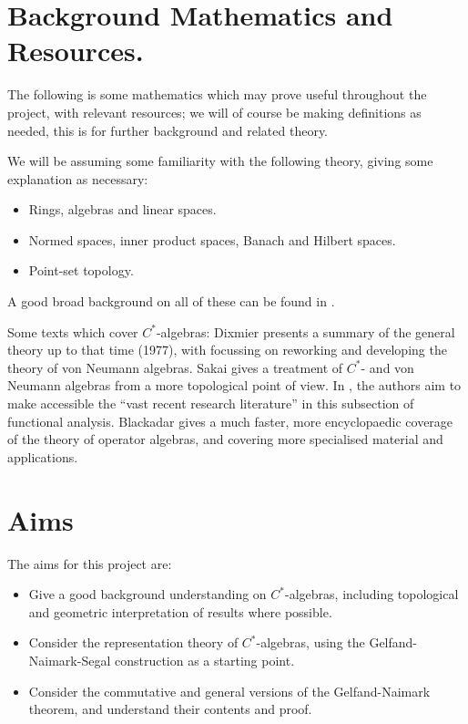 \documentclass[12pt,a4paper]{report}
\theoremstyle{plain}
\theoremstyle{definition}
\newcommand{\1}{\mathbbm{1}}
\begin{document}
\section{Background Mathematics and Resources.}	
	The following is some mathematics which may prove useful throughout the project, with relevant resources; 
	we will of course be making definitions as needed, this is for further background and related theory.

	We will be assuming some familiarity with the following theory, giving some explanation as necessary:
\begin{itemize}
	\item Rings, algebras and linear spaces.
	\item Normed spaces, inner product spaces, Banach and Hilbert spaces.
	\item Point-set topology.
\end{itemize}
	A good broad background on all of these can be found in \cite{simmons83}.

	Some texts which cover $C^\ast$-algebras: 
	Dixmier \cite{dixmier77} presents a summary of the general theory up to that time (1977), with 
	\cite{dixmier81} focussing on reworking and developing the theory of von Neumann algebras. 
	Sakai \cite{sakai71} gives a treatment of $C^\ast$- and von Neumann algebras from a more topological point 
	of view. In \cite{kadison83,kadison86}, the authors aim to make accessible the ``vast recent research 
	literature'' in this subsection of functional analysis.
	Blackadar \cite{blackadar06} gives a much faster, more encyclopaedic coverage of the theory of operator 
	algebras, and covering more specialised material and applications.
	
\section{Aims}
	The aims for this project are:
\begin{itemize}
	\item Give a good background understanding on $C^\ast$-algebras, including topological and geometric interpretation of results where possible.
	\item Consider the representation theory of $C^\ast$-algebras, using the Gelfand-Naimark-Segal construction as a starting point.
	\item Consider the commutative and general versions of the Gelfand-Naimark theorem, and understand their contents and proof.
\end{itemize}
\end{document}
